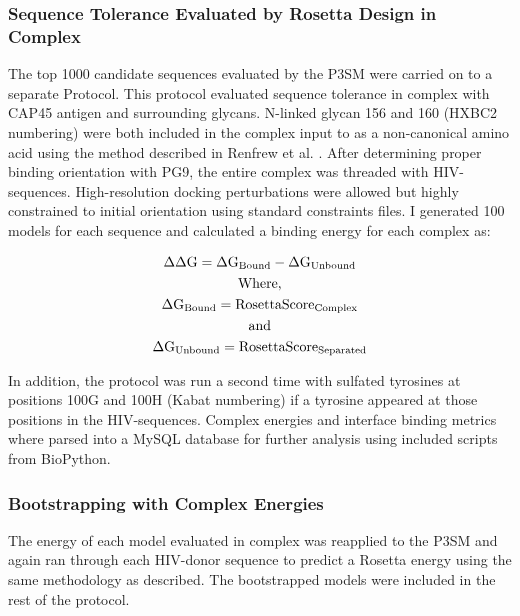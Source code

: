 \subsubsection{Sequence Tolerance Evaluated by Rosetta Design in Complex}
The top 1000 candidate sequences evaluated by the P3SM were carried on to a separate \rosetta Protocol. This protocol evaluated sequence tolerance in complex with CAP45 antigen and surrounding glycans. N-linked glycan 156 and 160 (HXBC2 numbering) were both included in the complex input to \rosetta as a non-canonical amino acid using the method described in Renfrew et al. \citep{Renfrew:2012ci}. After determining proper binding orientation with PG9, the entire complex was threaded with HIV-\naive sequences. High-resolution docking perturbations were allowed but highly constrained to initial orientation using standard \rosetta constraints files. I generated 100 models for each \naive sequence and calculated a binding energy for each complex as:

\begin{gather*}
    \Delta \Delta \textup{G} = \Delta \textup{G}_{\textup{Bound}} - \Delta \textup{G}_{\textup{Unbound}} \\
    \textup{Where,} \\
    \Delta \textup{G}_{\textup{Bound}} = \textup{RosettaScore}_{\textup{Complex}} \\
    \textup{and}\\
    \Delta \textup{G}_{\textup{Unbound}} = \textup{RosettaScore}_{\textup{Separated}}
\end{gather*}

In addition, the protocol was run a second time with sulfated tyrosines at positions 100G and 100H (Kabat numbering) if a tyrosine appeared at those positions in the HIV-\naive sequences. Complex energies and interface binding metrics where parsed into a MySQL database for further analysis using included scripts from BioPython.

\subsubsection{Bootstrapping with Complex Energies}
The energy of each model evaluated in complex was reapplied to the P3SM and again ran through each HIV-\naive donor sequence to predict a Rosetta energy using the same methodology as described. The bootstrapped models were included in the rest of the protocol.

